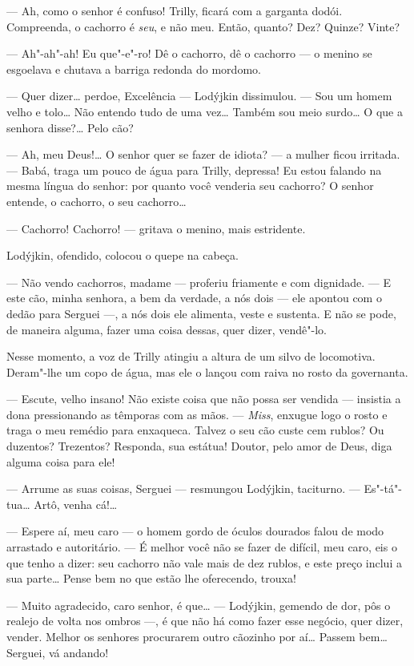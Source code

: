 --- Ah, como o senhor é confuso! Trilly, ficará com a garganta dodói.
Compreenda, o cachorro é \emph{seu}, e não meu. Então, quanto? Dez?
Quinze? Vinte?

--- Ah"-ah"-ah! Eu que"-e"-ro! Dê o cachorro, dê o cachorro --- o menino se
esgoelava e chutava a barriga redonda do mordomo.

--- Quer dizer\ldots{} perdoe, Excelência --- Lodýjkin dissimulou. --- Sou um
homem velho e tolo\ldots{} Não entendo tudo de uma vez\ldots{} Também sou meio
surdo\ldots{} O que a senhora disse?\ldots{} Pelo cão?

--- Ah, meu Deus!\ldots{} O senhor quer se fazer de idiota? --- a mulher
ficou irritada. --- Babá, traga um pouco de água para Trilly, depressa!
Eu estou falando na mesma língua do senhor: por quanto você venderia seu
cachorro? O senhor entende, o cachorro, o seu cachorro\ldots{}

--- Cachorro! Cachorro! --- gritava o menino, mais estridente.

Lodýjkin, ofendido, colocou o quepe na cabeça.

--- Não vendo cachorros, madame --- proferiu friamente e com dignidade.
--- E este cão, minha senhora, a bem da verdade, a nós dois --- ele
apontou com o dedão para Serguei ---, a nós dois ele alimenta, veste e
sustenta. E não se pode, de maneira alguma, fazer uma coisa dessas, quer
dizer, vendê"-lo.

Nesse momento, a voz de Trilly atingiu a altura de um silvo de
locomotiva. Deram"-lhe um copo de água, mas ele o lançou com raiva no
rosto da governanta.

--- Escute, velho insano! Não existe coisa que não possa ser vendida ---
insistia a dona pressionando as têmporas com as mãos. --- \emph{Miss},
enxugue logo o rosto e traga o meu remédio para enxaqueca. Talvez o seu
cão custe cem rublos? Ou duzentos? Trezentos? Responda, sua estátua!
Doutor, pelo amor de Deus, diga alguma coisa para ele!

--- Arrume as suas coisas, Serguei --- resmungou Lodýjkin, taciturno.
--- Es"-tá"-tua\ldots{} Artô, venha cá!\ldots{}

--- Espere aí, meu caro --- o homem gordo de óculos dourados falou de
modo arrastado e autoritário. --- É melhor você não se fazer de difícil,
meu caro, eis o que tenho a dizer: seu cachorro não vale mais de dez
rublos, e este preço inclui a sua parte\ldots{} Pense bem no que estão lhe
oferecendo, trouxa!

--- Muito agradecido, caro senhor, é que\ldots{} --- Lodýjkin, gemendo de
dor, pôs o realejo de volta nos ombros ---, é que não há como fazer esse
negócio, quer dizer, vender. Melhor os senhores procurarem outro
cãozinho por aí\ldots{} Passem bem\ldots{} Serguei, vá andando!

